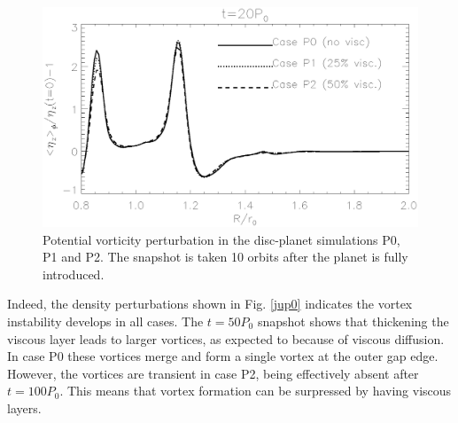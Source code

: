 \begin{figure}
  \centering
  \includegraphics[width=\linewidth]{figures/pdisk_vorten1d_cases_002.ps}
  \caption{Potential vorticity perturbation in the disc-planet
    simulations P0, P1 and P2. The snapshot is taken 10 orbits after
    the planet is fully introduced. %
    \label{planet_gap}}
\end{figure}

Indeed, the density perturbations shown in Fig. \ref{jup0} indicates the
vortex instability develops in all cases. The $t=50P_0$ 
snapshot shows that thickening the viscous layer leads to larger
vortices, as expected to because of viscous diffusion. In case P0
these vortices merge and form a single vortex at the outer gap edge.   
However, the vortices are transient in case P2, being effectively
absent after $t=100P_0$. This means that vortex formation can be
surpressed by having viscous layers. 


